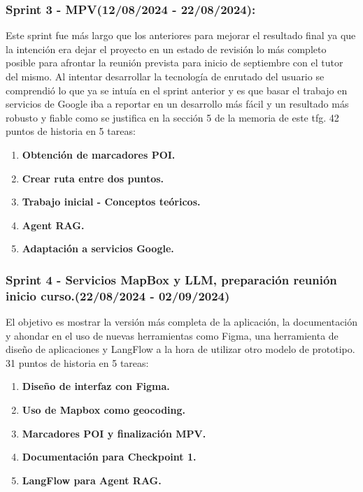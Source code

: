 \subsubsection{Sprint 3 - MPV(12/08/2024 - 22/08/2024):} 
Este sprint fue más largo que los anteriores para mejorar el resultado final ya que la intención era dejar el proyecto en un estado de revisión lo más completo posible para afrontar la reunión prevista para inicio de septiembre con el tutor del mismo. Al intentar desarrollar la tecnología de enrutado del usuario se comprendió lo que ya se intuía en el sprint anterior y es que basar el trabajo en servicios de Google iba a reportar en un desarrollo más fácil y un resultado más robusto y fiable como se justifica en la sección 5 de la memoria de este \acrshort{tfg}. 42 puntos de historia en 5 tareas:
    \begin{enumerate}
		\item \textbf{Obtención de marcadores POI.}
		\item \textbf{Crear ruta entre dos puntos.}
		\item \textbf{Trabajo inicial - Conceptos teóricos.}
		\item \textbf{Agent RAG.}
		\item \textbf{Adaptación a servicios Google.}
	\end{enumerate}


\subsubsection{Sprint 4 - Servicios MapBox y LLM, preparación reunión inicio curso.(22/08/2024 - 02/09/2024)}
    El objetivo es mostrar la versión más completa de la aplicación, la documentación y ahondar en el uso de nuevas herramientas como Figma, una herramienta de diseño de aplicaciones y LangFlow a la hora de utilizar otro modelo de prototipo. 31 puntos de historia en 5 tareas:
\begin{enumerate}
	\item \textbf{Diseño de interfaz con Figma.}
	\item \textbf{Uso de Mapbox como geocoding.}
	\item \textbf{Marcadores POI y finalización MPV.}
	\item \textbf{Documentación para Checkpoint 1.}
	\item \textbf{LangFlow para Agent RAG.}
\end{enumerate}

